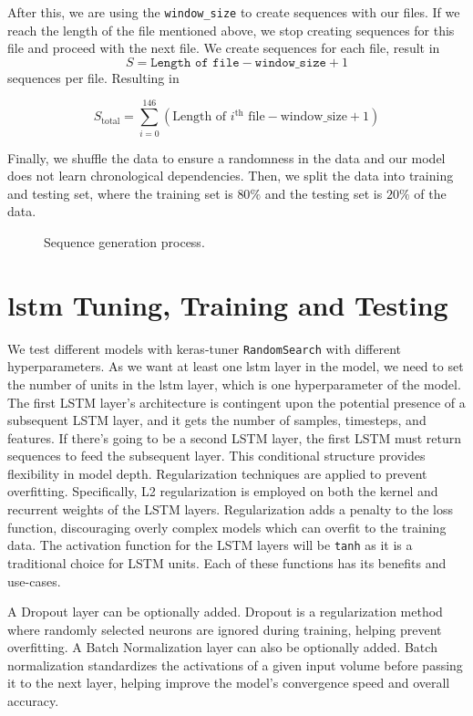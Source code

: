 After this, we are using the \texttt{window\_size} to create sequences with our files.
If we reach the length of the file mentioned above, we stop creating sequences for this file and proceed with the next file.
We create sequences for each file, result in 
\[S = \texttt{Length of file} - \texttt{window\_size} + 1\] 
sequences per file.
Resulting in 

\[
    S_{\text{total}} = \sum_{i=0}^{146} (\text{Length of } i^{\text{th}} \text{ file} - \text{window\_size} + 1)
\]

Finally, we shuffle the data to ensure a randomness in the data and our model does not learn chronological dependencies.
Then, we split the data into training and testing set, where the training set is \(80\%\) and the testing set is \(20\%\) of the data.
\begin{figure}[h]
    \centering
    
    \caption{Sequence generation process.}
    \label{fig:sequence_generation}
\end{figure}


\section{\ac{lstm} Tuning, Training and Testing}

We test different models with keras-tuner \cite{keras_tuner} \texttt{RandomSearch} with different hyperparameters.
As we want at least one \ac{lstm} layer in the model, we need to set the number of units in the \ac{lstm} layer, which is one hyperparameter of the model.
The first LSTM layer's architecture is contingent upon the potential presence of a subsequent LSTM layer, and it gets the number of samples, timesteps, and features.
If there's going to be a second LSTM layer, the first LSTM must return sequences to feed the subsequent layer.
This conditional structure provides flexibility in model depth.
Regularization techniques are applied to prevent overfitting.
Specifically, L2 regularization is employed on both the kernel and recurrent weights of the LSTM layers.
Regularization adds a penalty to the loss function, discouraging overly complex models which can overfit to the training data.
The activation function for the LSTM layers will be \texttt{tanh} as it is a traditional choice for LSTM units.
Each of these functions has its benefits and use-cases.

A Dropout layer can be optionally added. 
Dropout is a regularization method where randomly selected neurons are ignored during training, helping prevent overfitting.
A Batch Normalization layer can also be optionally added.
Batch normalization standardizes the activations of a given input volume before passing it to the next layer, helping improve the model's convergence speed and overall accuracy.

